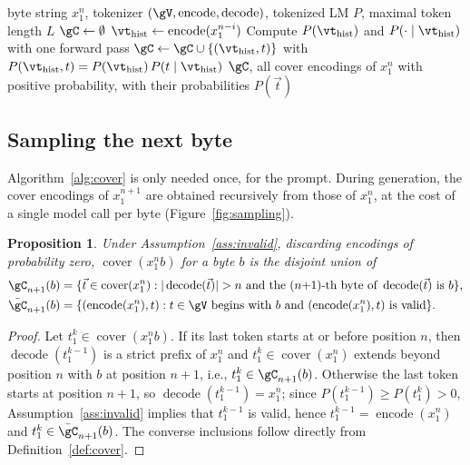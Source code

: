 \documentclass{article} %
\newtheorem{proposition}{Proposition}
\newcommand{\enc}{\operatorname{encode}}
\newcommand{\dec}{\operatorname{decode}}
\newcommand{\cover}{\operatorname{cover}}
\newcommand{\tseq}{\vec{t}}
\begin{document}
\begin{algorithm}[t]
\caption{Search for cover encodings by backward tokenization}
\label{alg:cover}
\begin{algorithmic}[1]
\Require byte string $x_1^n$, tokenizer $(\gV, \enc, \dec)$, tokenized LM $P$, maximal token length $L$
\State $\gC \gets \emptyset$
  \State $\vt_{\mathrm{hist}} \gets \enc(x_1^{n-i})$ 
  \State Compute $P(\vt_{\mathrm{hist}})$ and $P(\cdot\mid\vt_{\mathrm{hist}})$ with one forward pass
     \Comment{$\enc(\dec(\vt_{\mathrm{hist}}, t)) = (\vt_{\mathrm{hist}}, t)$}
      \State $\gC \gets \gC \cup \{(\vt_{\mathrm{hist}}, t)\}$ with $P(\vt_{\mathrm{hist}}, t) = P(\vt_{\mathrm{hist}})\,P(t\mid\vt_{\mathrm{hist}})$
    \EndIf
  \EndFor
\EndFor
\State \Return $\gC$, all cover encodings of $x_1^n$ with positive probability, with their probabilities $P(\tseq)$
\end{algorithmic}
\end{algorithm}

\subsection{Sampling the next byte}
\label{sec:sampling}
Algorithm~\ref{alg:cover} is only needed once, for the prompt. During generation, the cover encodings of $x_1^{n+1}$ are obtained recursively from those of $x_1^n$, at the cost of a single model call per byte (Figure~\ref{fig:sampling}).

\begin{proposition}
\label{prop:recursion}
Under Assumption~\ref{ass:invalid}, discarding encodings of probability zero, $\cover(x_1^n b)$ for a byte $b$ is the disjoint union of
\begin{align}
\gC_{n+1}(b) &= \{\tseq\in\cover(x_1^n) : |\dec(\tseq)| > n \text{ and the } (n{+}1)\text{-th byte of } \dec(\tseq) \text{ is } b\}, \\
\bar{\gC}_{n+1}(b) &= \{(\enc(x_1^n), t) : t\in\gV \text{ begins with } b \text{ and } (\enc(x_1^n), t) \text{ is valid}\}.
\end{align}
\end{proposition}
\begin{proof}
Let $t_1^k\in\cover(x_1^n b)$. If its last token starts at or before position $n$, then $\dec(t_1^{k-1})$ is a strict prefix of $x_1^n$ and $t_1^k \in \cover(x_1^n)$ extends beyond position $n$ with $b$ at position $n+1$, i.e., $t_1^k\in\gC_{n+1}(b)$. Otherwise the last token starts at position $n+1$, so $\dec(t_1^{k-1}) = x_1^n$; since $P(t_1^{k-1}) \ge P(t_1^k) > 0$, Assumption~\ref{ass:invalid} implies that $t_1^{k-1}$ is valid, hence $t_1^{k-1} = \enc(x_1^n)$ and $t_1^k\in\bar\gC_{n+1}(b)$. The converse inclusions follow directly from Definition~\ref{def:cover}.
\end{proof}
\end{document}
